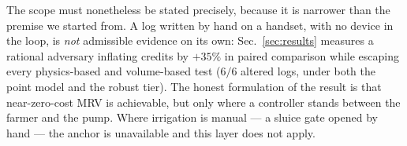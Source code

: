 The scope must nonetheless be stated precisely, because it is narrower than the
premise we started from. A log written by hand on a handset, with no device in
the loop, is \emph{not} admissible evidence on its own: Sec.~\ref{sec:results}
measures a rational adversary inflating credits by $+35\%$ in paired
comparison while escaping every physics-based and volume-based test
($6/6$ altered logs, under both the point model and the robust tier). The honest formulation of the result is that
near-zero-cost MRV is achievable, but only where a controller stands between the
farmer and the pump. Where irrigation is manual --- a sluice gate opened by hand
--- the anchor is unavailable and this layer does not apply.

